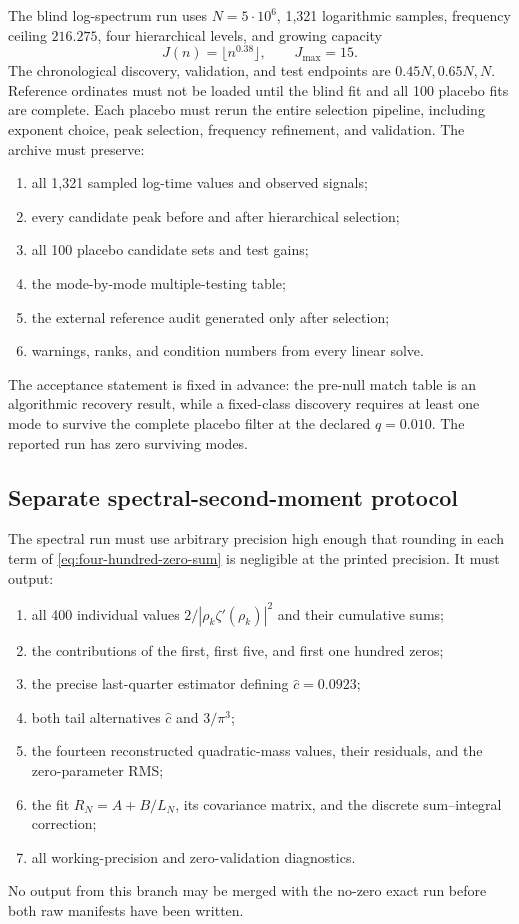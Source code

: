 \documentclass[11pt,reqno]{amsart}
\numberwithin{equation}{section}
\theoremstyle{plain}
\theoremstyle{definition}
\theoremstyle{remark}
\begin{document}
The blind log-spectrum run uses \(N=5\cdot10^6\), 1,321 logarithmic samples,
frequency ceiling \(216.275\), four hierarchical levels, and growing capacity
\begin{equation}
J(n)=\lfloor n^{0.38}\rfloor,\qquad J_{\max}=15.
\label{eq:blind-spectrum-capacity}
\end{equation}
The chronological discovery, validation, and test endpoints are
\(0.45N,0.65N,N\).  Reference ordinates must not be loaded until the blind
fit and all 100 placebo fits are complete.  Each placebo must rerun the
entire selection pipeline, including exponent choice, peak selection,
frequency refinement, and validation.  The archive must preserve:
\begin{enumerate}[label=(\alph*)]
\item all 1,321 sampled log-time values and observed signals;
\item every candidate peak before and after hierarchical selection;
\item all 100 placebo candidate sets and test gains;
\item the mode-by-mode multiple-testing table;
\item the external reference audit generated only after selection;
\item warnings, ranks, and condition numbers from every linear solve.
\end{enumerate}
The acceptance statement is fixed in advance: the pre-null match table is an
algorithmic recovery result, while a fixed-class discovery requires at least
one mode to survive the complete placebo filter at the declared
\(q=0.010\).  The reported run has zero surviving modes.

\subsection{Separate spectral-second-moment protocol}
\label{subsec:spectral-second-moment-protocol}

The spectral run must use arbitrary precision high enough that rounding in
each term of \eqref{eq:four-hundred-zero-sum} is negligible at the printed
precision.  It must output:
\begin{enumerate}[label=(\alph*)]
\item all 400 individual values
\(2/|\rho_k\zeta'(\rho_k)|^2\) and their cumulative sums;
\item the contributions of the first, first five, and first one hundred
zeros;
\item the precise last-quarter estimator defining \(\widehat c=0.0923\);
\item both tail alternatives \(\widehat c\) and \(3/\pi^3\);
\item the fourteen reconstructed quadratic-mass values, their residuals, and
the zero-parameter RMS;
\item the fit \(R_N=A+B/L_N\), its covariance matrix, and the discrete
sum--integral correction;
\item all working-precision and zero-validation diagnostics.
\end{enumerate}
No output from this branch may be merged with the no-zero exact run before
both raw manifests have been written.
\end{document}
